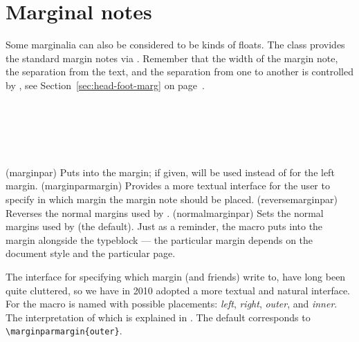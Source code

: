  \section{Marginal notes}

     Some marginalia can also be considered to be kinds of floats. 
The class provides the standard margin notes 
via \cmd{\marginpar}. Remember that the width of the margin note, the
separation from the text, and the separation from one \cmd{\marginpar}
to another is controlled by \cmd{\setmarginnotes}, see
Section~\ref{sec:head-foot-marg} on
page~\pageref{sec:head-foot-marg}. 

 \begin{syntax}
 \cmd{\marginpar} \\
 \cmd{\marginparmargin}\\
 \cmd{\reversemarginpar} \\
 \cmd{\normalmarginpar} \\
 \end{syntax}
\glossary(marginpar)%
  {}%
  {Puts  into the margin; if given,  will be
   used instead of  for the left margin.}
\glossary(marginparmargin)%
  {}%
  {Provides a more textual
    interface for the user to specify in which margin the margin note
    should be placed.}
\glossary(reversemarginpar)%
  {}%
  {Reverses the normal margins used by .}
\glossary(normalmarginpar)%
  {}%
  {Sets the normal margins used by (the default).}
 Just as a reminder, the \cmd{\marginpar} macro puts  into
the margin alongside the typeblock --- the particular margin depends
on the document style and the particular page. 

The interface for specifying which margin \cmd{\marginpar} (and
friends) write to, have long been quite cluttered, so we have in 2010 
adopted a more textual and natural interface. For \cmd{\marginpar} the
macro is named \cmd{\marginparmargin} with possible
placements: \emph{left}, \emph{right}, \emph{outer}, and
\emph{inner}. The interpretation of which is explained in .
The default corresponds to \verb?\marginparmargin{outer}?.


